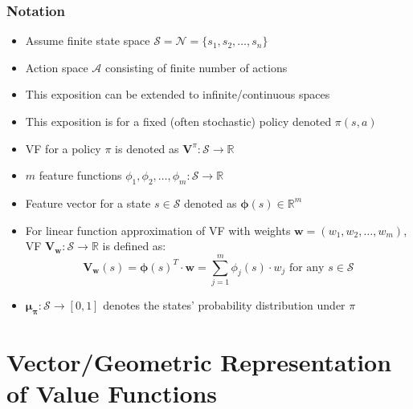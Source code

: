 \documentclass[handout]{beamer}
\newcommand{\vw}{\bm{V_w}}
\newcommand{\vpi}{\bm{V}^{\pi}}
\newcommand{\bmu}{\bm{\mu_{\pi}}}
\newcommand{\bw}{\bm{w}}
\begin{document}
\begin{frame}
\frametitle{Notation}
\pause
\begin{itemize}[<+->]
\item Assume finite state space $\mathcal{S} = \mathcal{N} = \{s_1, s_2, \ldots, s_n\}$
\item Action space $\mathcal{A}$ consisting of finite number of actions
\item This exposition can be extended to infinite/continuous spaces
\item This exposition is for a fixed (often stochastic) policy denoted $\pi(s,a)$
\item VF for a policy $\pi$ is denoted as $\vpi: \mathcal{S} \rightarrow \mathbb{R}$
\item $m$ feature functions $\phi_1, \phi_2, \ldots, \phi_m : \mathcal{S} \rightarrow \mathbb{R}$
\item Feature vector for a state $s \in \mathcal{S}$ denoted as $\bm{\phi}(s) \in \mathbb{R}^m$
\item For linear function approximation of VF with weights $\bw = (w_1, w_2, \ldots, w_m)$,
VF $\vw: \mathcal{S} \rightarrow \mathbb{R}$ is defined as:
$$\vw(s) = \bm{\phi}(s)^T \cdot \bw =  \sum_{j=1}^m \phi_j(s) \cdot w_j \mbox{ for any } s \in \mathcal{S}$$
\item $\bmu : \mathcal{S} \rightarrow [0, 1]$ denotes the states' probability distribution under $\pi$ 
\end{itemize}
\end{frame}

\section{Vector/Geometric Representation of Value Functions}
\end{document}
